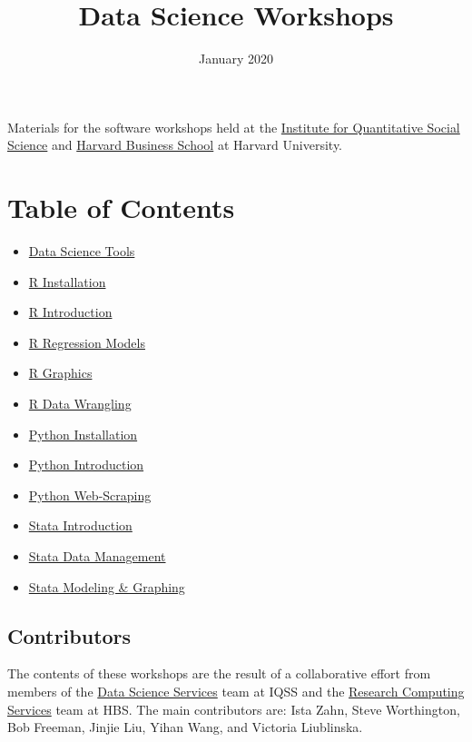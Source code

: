 \documentclass[
]{book}
\title{Data Science Workshops}
\author{}
\date{\vspace{-2.5em}January 2020}
\providecommand{\tightlist}{%
  \setlength{\itemsep}{0pt}\setlength{\parskip}{0pt}}
\begin{document}
\frontmatter
\maketitle

{
\setcounter{tocdepth}{1}
\tableofcontents
}
\mainmatter
Materials for the software workshops held at the \href{http://dss.iq.harvard.edu/}{Institute for Quantitative Social Science} and \href{https://training.rcs.hbs.org}{Harvard Business School} at Harvard University.

\hypertarget{table-of-contents}{%
\chapter*{Table of Contents}\label{table-of-contents}}

\begin{itemize}
\tightlist
\item
  \href{./DataScienceTools.html}{Data Science Tools}
\item
  \href{./Rinstall.html}{R Installation}
\item
  \href{./Rintro.html}{R Introduction}
\item
  \href{./Rmodels.html}{R Regression Models}
\item
  \href{./Rgraphics.html}{R Graphics}
\item
  \href{./RDataWrangling.html}{R Data Wrangling}
\item
  \href{./PythonInstall.html}{Python Installation}
\item
  \href{./PythonIntro.html}{Python Introduction}
\item
  \href{./PythonWebScrape.html}{Python Web-Scraping}
\item
  \href{./StataIntro.html}{Stata Introduction}
\item
  \href{./StataDatMan.html}{Stata Data Management}
\item
  \href{./StataModGraph.html}{Stata Modeling \& Graphing}
\end{itemize}

\hypertarget{contributors}{%
\section*{Contributors}\label{contributors}}

The contents of these workshops are the result of a collaborative effort from members of the \href{http://dss.iq.harvard.edu}{Data Science Services} team at IQSS and the \href{https://training.rcs.hbs.org}{Research Computing Services} team at HBS. The main contributors are: Ista Zahn, Steve Worthington, Bob Freeman, Jinjie Liu, Yihan Wang, and Victoria Liublinska.
\end{document}
